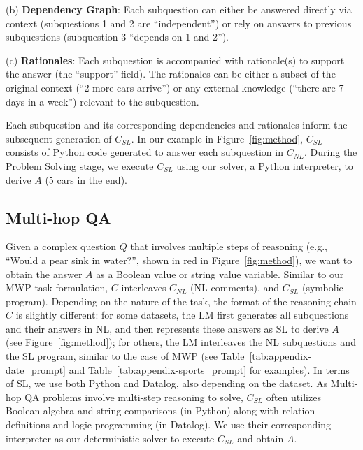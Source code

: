 \documentclass[11pt]{article}
\begin{document}
(b) \textbf{Dependency Graph}: Each subquestion can either be answered directly via context (subquestions 1 and 2 are ``independent'') or rely on answers to previous subquestions (subquestion 3 ``depends on 1 and 2'').

(c) \textbf{Rationales}: Each subquestion is accompanied with 
 rationale(s) to support the answer (the ``support'' field). The rationales can be either a subset of the original context (``2 more cars
arrive'') or any external knowledge (``there are 7 days in a week'') relevant to the subquestion.

Each subquestion and its corresponding dependencies and rationales inform the subsequent generation of  $C_{SL}$. In our example in Figure~\ref{fig:method}, $C_{SL}$ consists of Python code generated to answer each subquestion in $C_{NL}$. During the Problem Solving stage, we execute $C_{SL}$ using our solver, a Python interpreter, to derive $A$ (5 cars in the end).

\subsection{Multi-hop QA} Given a complex question $Q$ that involves multiple steps of reasoning (e.g., ``Would a pear sink in water?'', shown in red in Figure~\ref{fig:method}), we want to obtain the answer $A$ as a Boolean value or string value variable. Similar to our MWP task formulation, $C$ interleaves $C_{NL}$ (NL comments), and $C_{SL}$ (symbolic program). Depending on the nature of the task, the format of the reasoning chain $C$ is slightly different: for some datasets, the LM first generates all subquestions and their answers in NL, and then represents these answers as SL to derive $A$ (see Figure~\ref{fig:method}); for others, the LM interleaves the NL subquestions and the SL program, similar to the case of MWP (see Table~\ref{tab:appendix-date_prompt} and Table~\ref{tab:appendix-sports_prompt} for examples).
In terms of SL, we use both Python and Datalog, also depending on the dataset. As Multi-hop QA problems involve multi-step reasoning to solve, $C_{SL}$ often utilizes Boolean algebra and string comparisons (in Python) along with relation definitions and logic programming (in Datalog). We use their corresponding interpreter as our deterministic solver to execute $C_{SL}$ and obtain $A$. 
\end{document}
